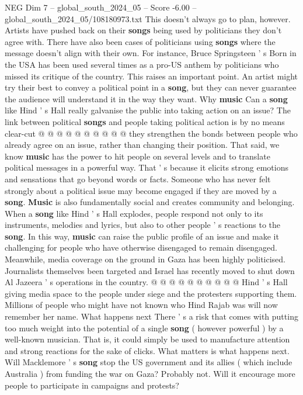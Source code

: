 \begin{textsample}{NEG Dim 7 – global\_south\_2024\_05 – Score -6.00 – global\_south\_2024\_05/108180973.txt}
This doesn't always go to plan, however.
Artists have pushed back on their \textbf{songs} being used by politicians they don't agree with.
There have also been cases of politicians using \textbf{songs} where the message doesn't align with their own.
For instance, Bruce Springsteen ' s Born in the USA has been used several times as a pro-US anthem by politicians who missed its critique of the country.
This raises an important point.
An artist might try their best to convey a political point in a \textbf{song}, but they can never guarantee the audience will understand it in the way they want.
Why \textbf{music} Can a \textbf{song} like Hind ' s Hall really galvanise the public into taking action on an issue?
The link between political \textbf{songs} and people taking political action is by no means clear-cut @ @ @ @ @ @ @ @ @ @ they strengthen the bonds between people who already agree on an issue, rather than changing their position.
That said, we know \textbf{music} has the power to hit people on several levels and to translate political messages in a powerful way.
That ' s because it elicits strong emotions and sensations that go beyond words or facts.
Someone who has never felt strongly about a political issue may become engaged if they are moved by a \textbf{song}. \textbf{Music} is also fundamentally social and creates community and belonging.
When a \textbf{song} like Hind ' s Hall explodes, people respond not only to its instruments, melodies and lyrics, but also to other people ' s reactions to the \textbf{song}.
In this way, \textbf{music} can raise the public profile of an issue and make it challenging for people who have otherwise disengaged to remain disengaged.
Meanwhile, media coverage on the ground in Gaza has been highly politicised.
Journalists themselves been targeted and Israel has recently moved to shut down Al Jazeera ' s operations in the country. @ @ @ @ @ @ @ @ @ @ Hind ' s Hall giving media space to the people under siege and the protesters supporting them.
Millions of people who might have not known who Hind Rajab was will now remember her name.
What happens next There ' s a risk that comes with putting too much weight into the potential of a single \textbf{song} ( however powerful ) by a well-known musician.
That is, it could simply be used to manufacture attention and strong reactions for the sake of clicks.
What matters is what happens next.
Will Macklemore ' s \textbf{song} stop the US government and its allies ( which include Australia ) from funding the war on Gaza?
Probably not.
Will it encourage more people to participate in campaigns and protests?

\end{textsample}
